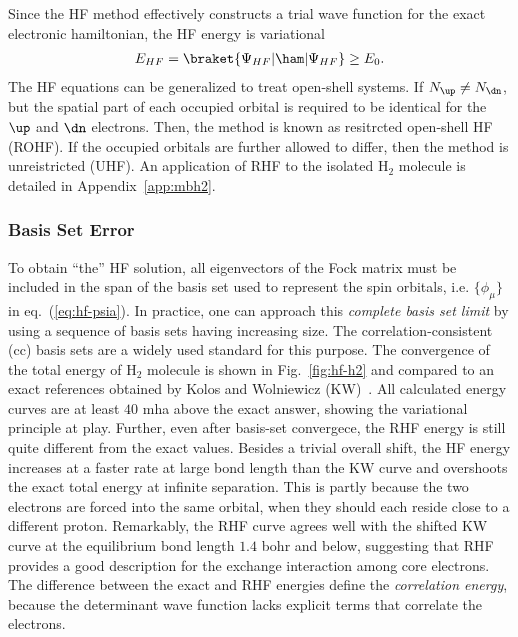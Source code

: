 Since the HF method effectively constructs a trial wave function for the exact electronic hamiltonian, the HF energy is variational
\begin{align}
E_{HF} = \braket{\Psi_{HF}|\ham|\Psi_{HF}} \ge E_0.
\end{align}
The HF equations can be generalized to treat open-shell systems.
If $N_{\up} \neq N_{\dn}$, but the spatial part of each occupied orbital is required to be identical for the $\up$ and $\dn$ electrons. Then, the method is known as resitrcted open-shell HF (ROHF).
If the occupied orbitals are further allowed to differ, then the method is unreistricted (UHF).
An application of RHF to the isolated H$_2$ molecule is detailed in Appendix~\ref{app:mbh2}.

\subsubsection{Basis Set Error}

To obtain ``the'' HF solution, all eigenvectors of the Fock matrix must be included in the span of the basis set used to represent the spin orbitals, i.e. $\{\phi_\mu\}$ in eq.~(\ref{eq:hf-psia}).
In practice, one can approach this \textit{complete basis set limit} by using a sequence of basis sets having increasing size.
The correlation-consistent (cc) basis sets are a widely used standard for this purpose.
The convergence of the total energy of H$_2$ molecule is shown in Fig.~\ref{fig:hf-h2} and compared to an exact references obtained by Kolos and Wolniewicz (KW)~\cite{Kolos1964}.
All calculated energy curves are at least $40$ mha above the exact answer, showing the variational principle at play.
Further, even after basis-set convergece, the RHF energy is still quite different from the exact values.
Besides a trivial overall shift, the HF energy increases at a faster rate at large bond length than the KW curve and overshoots the exact total energy at infinite separation.
This is partly because the two electrons are forced into the same orbital, when they should each reside close to a different proton.
Remarkably, the RHF curve agrees well with the shifted KW curve at the equilibrium bond length $1.4$ bohr and below, suggesting that RHF provides a good description for the exchange interaction among core electrons.
The difference between the exact and RHF energies define the \textit{correlation energy}, because the determinant wave function lacks explicit terms that correlate the electrons.

